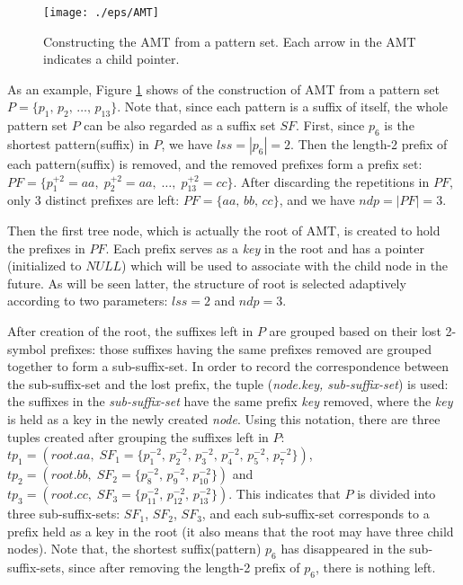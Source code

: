\documentclass{article}
\begin{document}
\begin{figure}[htbp]
  \centering
  \texttt{[image: ./eps/AMT]}
  \caption{Constructing the AMT from a pattern set. Each arrow
    in the AMT indicates a child pointer.}
  \label{fig:AMT}
\end{figure}

As an example, Figure \ref{fig:AMT} shows of the construction of AMT
from a pattern set $P = \{p_1,\, p_2,\, \dots,\, p_{13}\}$. Note that,
since each pattern is a suffix of itself, the whole pattern set $P$
can be also regarded as a suffix set $SF$. First, since $p_6$ is the
shortest pattern(suffix) in $P$, we have $lss = |p_6| = 2$. Then the
length-2 prefix of each pattern(suffix) is removed, and the removed
prefixes form a prefix set:
$PF = \{p_1^{+2} = aa,\; p_2^{+2} = aa,\; \dots,\; p_{13}^{+2} =
cc\}$. After discarding the repetitions in $PF$, only 3 distinct
prefixes are left: $PF = \{aa,\, bb,\, cc\}$, and we have
$ndp = |PF| = 3$.

Then the first tree node, which is actually the root of AMT, is
created to hold the prefixes in $PF$. Each prefix serves as a
\emph{key} in the root and has a pointer (initialized to $NULL$) which
will be used to associate with the child node in the future. As will
be seen latter, the structure of root is selected adaptively according
to two parameters: $lss=2$ and $ndp=3$.

After creation of the root, the suffixes left in $P$ are grouped based
on their lost 2-symbol prefixes: those suffixes having the same
prefixes removed are grouped together to form a sub-suffix-set. In
order to record the correspondence between the sub-suffix-set and the
lost prefix, the tuple (\emph{node.key,\; sub-suffix-set}) is used:
the suffixes in the \emph{sub-suffix-set} have the same prefix
\emph{key} removed, where the \emph{key} is held as a key in the newly
created \emph{node}. Using this notation, there are three tuples
created after grouping the suffixes left in $P$:
$tp_1 = (root.aa,\; SF_1=\{p_1^{-2},\, p_2^{-2},\, p_3^{-2},\,
p_4^{-2},\, p_5^{-2},\, p_7^{-2}\})$,\,
$tp_2 = (root.bb,\; SF_2=\{p_8^{-2},\, p_9^{-2},\, p_{10}^{-2}\})$ and
$tp_3 = (root.cc,\; SF_3=\{p_{11}^{-2},\, p_{12}^{-2},\,
p_{13}^{-2}\})$. This indicates that $P$ is divided into three
sub-suffix-sets: $SF_1$, $SF_2$, $SF_3$, and each sub-suffix-set
corresponds to a prefix held as a key in the root (it also means that
the root may have three child nodes). Note that, the shortest
suffix(pattern) $p_6$ has disappeared in the sub-suffix-sets, since
after removing the length-2 prefix of $p_6$, there is nothing left.
\end{document}
